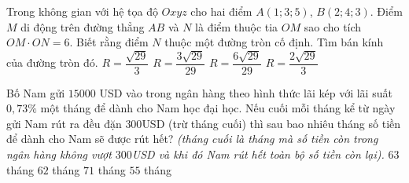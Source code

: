\begin{ex}%
Trong không gian với hệ tọa độ $Oxyz$ cho hai điểm $A\left(1; 3; 5\right)$, $B\left(2; 4; 3\right)$. Điểm $M$ di động trên đường thẳng $AB$ và $N$ là điểm thuộc tia $OM$ sao cho tích $OM\cdot ON=6$. Biết rằng điểm $N$ thuộc một đường tròn cố định. Tìm bán kính của đường tròn đó.
\choice
{$R=\dfrac{\sqrt{29}}{3}$}
{\True $R=\dfrac{3\sqrt{29}}{29}$}
{$R=\dfrac{6\sqrt{29}}{29}$}
{$R=\dfrac{2\sqrt{29}}{3}$}
\end{ex}

\begin{ex}%
	Bố Nam gửi $15000$ USD  vào trong ngân hàng theo hình thức lãi kép với lãi suất  $0{,}73\%$ một tháng để dành cho Nam học đại học. Nếu cuối mỗi tháng kể từ ngày gửi Nam rút ra đều đặn $300$USD (trừ tháng cuối) thì sau bao nhiêu tháng số tiền để dành cho Nam sẽ được rút hết? \textit{(tháng cuối là tháng mà số tiền còn trong ngân hàng không vượt $300$USD và khi đó Nam rút hết toàn bộ số tiền còn lại).}
	\choice
	{\True  $63$ tháng}
	{$62$ tháng}
	{$71$ tháng}
	{$55$ tháng}
\end{ex}

